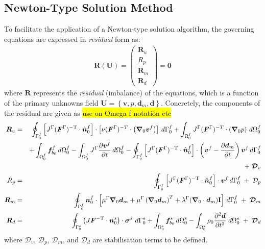\documentclass[sn-mathphys,Numbered]{sn-jnl}%
\newcommand{\bb}{\boldsymbol}
\begin{document}
\subsection{Newton-Type Solution Method}
To facilitate the application of a Newton-type solution algorithm, the governing equations are expressed in \emph{residual} form as:
\begin{eqnarray} \label{eqn:residual}
	    \bb{R}(\bb{U}) =
	         \begin{pmatrix}
			\bb{R}_u  \\
			R_p \\
			\bb{R}_m \\
		    	\bb{R}_d
		    \end{pmatrix}
		= \bb{0}
\end{eqnarray}
where $\bb{R}$ represents the \emph{residual} (imbalance) of the equations, which is a function of the primary unknowns field $\bb{U} = \left\{\bb{v}, p, \bb{d}_m, \bb{d} \right\}$.
Concretely, the components of the residual are given as \hl{use on Omega f notation etc}
\begin{eqnarray} \label{eq:residuals}
    \bb{R}_u %
    &=&
	\oint_{\Gamma^f_0}  \left[ J^\Gamma (\bb{F}^\Gamma)^{-\text{T}} \cdot \hat{\bb{n}}_0^f \right]
		\cdot \left[\nu (\bb{F}^\Gamma)^{-T} \cdot \left( \bb{\nabla}_0 \bb{v}^f \right) \right] \, d\Gamma^f_0
	+ \int_{\Omega^f_0} J^\Gamma (\bb{F}^\Gamma)^{-T} \cdot \left( \bb{\nabla}_0 p \right) \, d\Omega^f_0 \notag \\
	&&+ \int_{\Omega^f_0} \bb{f}_{b_0}^f \, d\Omega^f_0
	- \int_{\Omega^f_0} J^\Gamma \frac{\partial \bb{v}^f}{\partial t} \, d\Omega^f_0 
	- \oint_{\Gamma^f_0}  \left[ J^\Gamma (\bb{F}^\Gamma)^{-\text{T}} \cdot \hat{\bb{n}}_0^f \right] \cdot \left(\bb{v}^f - \frac{\partial \bb{d}_m}{\partial t}\right) \bb{v}^f \, d\Gamma^f_0
	\notag \\
	&&+\; \bb{\mathcal{D}}_v
	\notag \\
    R_p %
    &=&	\oint_{\Gamma^f_0}  \left[ J^\Gamma (\bb{F}^\Gamma)^{-\text{T}}  \cdot \hat{\bb{n}}_0^f \right] \cdot \bb{v}^f \, d\Gamma^f_0 \;+\; \mathcal{D}_p
    \notag \\
    \bb{R}_m
    &=&
    \oint_{\Gamma_0^f} \bb{n}_0^f \cdot
    \left[
    \mu^\Gamma \bb{\nabla}_0 \bb{d}_m + \mu^\Gamma \left(\bb{\nabla}_0 \bb{d}_m \right)^T
    + \lambda^\Gamma (\bb{\nabla}_0 \cdot \bb{d}_m) \textbf{I}
    \right]
    \, d\Gamma_0^f
    \;+\; \bb{\mathcal{D}}_m
    \notag \\
    \bb{R}_d %
    &=&
    \oint_{\Gamma_0^s} \left( J \bb{F}^{-\text{T}} \cdot \bb{n}_0^s \right) \cdot \bb{\sigma}^s \ d\Gamma_0^s
    + \int_{\Omega_0^s}  \bb{f}_{b_0}^s \, d\Omega_0^s
    - \int_{\Omega_0^s} \rho_0 \frac{\partial^2 \bb{d} }{\partial t^2} \; d\Omega_0^s
    \;+\; \bb{\mathcal{D}}_d
\end{eqnarray}
where $\bb{\mathcal{D}}_v$, $\mathcal{D}_p$, $\bb{\mathcal{D}}_m$, and $\bb{\mathcal{D}}_d$ are stabilisation terms to be defined.
\end{document}
